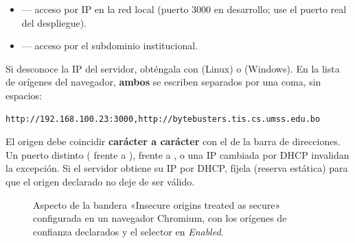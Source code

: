 \begin{itemize}[noitemsep]
    \item {} — acceso por IP en la red local (puerto 3000 en desarrollo; use el puerto real del despliegue).
    \item {} — acceso por el subdominio institucional.
\end{itemize}

Si desconoce la IP del servidor, obténgala con  (Linux) o
 (Windows). En la lista de orígenes del navegador, \textbf{ambos} se
escriben separados por una coma, sin espacios:\par

\begin{lstlisting}[basicstyle=\ttfamily\small,numbers=none,frame=single,backgroundcolor=\color{grisTecnico}]
http://192.168.100.23:3000,http://bytebusters.tis.cs.umss.edu.bo
\end{lstlisting}

\begin{AvisoPrecaucion}
El origen debe coincidir \textbf{carácter a carácter} con el de la barra de direcciones. Un
puerto distinto ( frente a ),  frente a ,
o una IP cambiada por DHCP invalidan la excepción. Si el servidor obtiene su IP por DHCP,
fíjela (reserva estática) para que el origen declarado no deje de ser válido.
\end{AvisoPrecaucion}

\vspace{0.3cm}
\begin{figure}[h!]
\centering
{}
\caption{Aspecto de la bandera «Insecure origins treated as secure» configurada en un navegador Chromium, con los orígenes de confianza declarados y el selector en \textit{Enabled}.}%
\label{fig:flag-mockup}
\end{figure}

